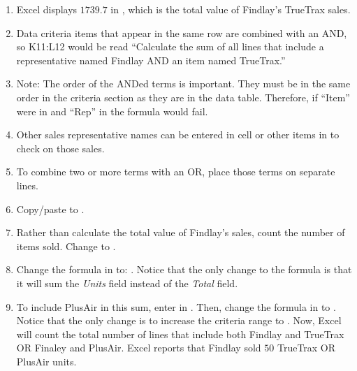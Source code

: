 \begin{enumerate}
	\item Excel displays $ 1739.7 $ in , which is the total value of Findlay's TrueTrax sales. 
	\item Data criteria items that appear in the same row are combined with an AND, so K11:L12 would be read ``Calculate the sum of all lines that include a representative named Findlay AND an item named TrueTrax.''
	\item Note: The order of the ANDed terms is important. They must be in the same order in the criteria section as they are in the data table. Therefore, if ``Item'' were in  and ``Rep'' in  the formula would fail.
	\item Other sales representative names can be entered in cell  or other items in  to check on those sales.
	\item To combine two or more terms with an OR, place those terms on separate lines. 
	\item Copy/paste  to .
	\item Rather than calculate the total value of Findlay's sales, count the number of items sold. Change  to .
	\item Change the formula in  to: . Notice that the only change to the formula is that it will sum the \textit{Units} field instead of the \textit{Total} field.
	\item To include PlusAir in this sum, enter  in . Then, change the formula in  to . Notice that the only change is to increase the criteria range to . Now, Excel will count the total number of lines that include both Findlay and TrueTrax OR Finaley and PlusAir. Excel reports that Findlay sold $ 50 $ TrueTrax OR PlusAir units.
	

\end{enumerate}
